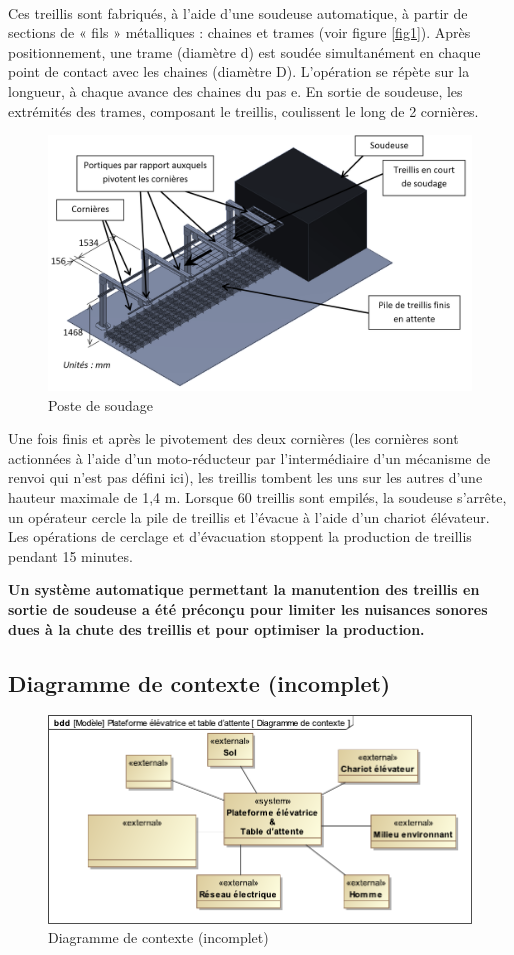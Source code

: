 ~\

Ces treillis sont fabriqués, à l'aide d'une soudeuse automatique, à partir de sections de « fils » métalliques : chaines et trames (voir figure \ref{fig1}). Après positionnement, une trame (diamètre d) est soudée simultanément en chaque point de contact avec les chaines (diamètre D). L'opération se répète sur la longueur, à chaque avance des chaines du pas e. En sortie de soudeuse, les extrémités des trames, composant le treillis, coulissent le long de 2 cornières.

\begin{figure}[!h]
\centering
\includegraphics[width=0.6\linewidth]{img/fig2}
\caption{Poste de soudage}
\label{fig2}
\end{figure}

Une fois finis et après le pivotement des deux cornières (les cornières sont actionnées à l'aide d'un moto-réducteur par l'intermédiaire d'un mécanisme de renvoi qui n'est pas défini ici), les treillis tombent les uns sur les autres d'une hauteur  maximale de 1,4 m. Lorsque 60 treillis sont empilés, la soudeuse s'arrête, un opérateur cercle la pile de treillis et l'évacue à l'aide d'un chariot élévateur. Les opérations de cerclage et d'évacuation stoppent la production de treillis pendant 15 minutes.

\textbf{Un système automatique permettant la manutention des treillis en sortie de soudeuse a été préconçu pour limiter les nuisances sonores dues à la chute des treillis et pour optimiser la production.}

\subsection{Diagramme de contexte (incomplet)}

\begin{figure}[!h]
\centering
\includegraphics[width=0.7\linewidth]{img/Diagramme_de_contexte_vide}
\caption{Diagramme de contexte (incomplet)}
\label{Diagramme_de_contexte_vide}
\end{figure}


